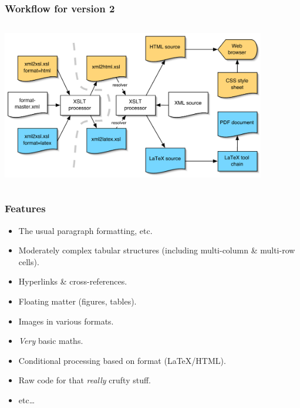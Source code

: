 \documentclass[pdftex]{beamer}
\begin{document}
\frame
{
	\frametitle{Workflow for version 2}
	
	\centering
	
	\begin{columns}
	
		\begin{column}{12cm}
	
			\centering
			\includegraphics[height=6.5cm,keepaspectratio]{v2_workflow}
		
		\end{column}
		
	\end{columns}
	
}


\frame
{
	\frametitle{Features}
	
	\begin{itemize}
	
		\item The usual paragraph formatting, etc.
		
		\item Moderately complex tabular structures (including
		multi-column \& multi-row cells).
		
		\item Hyperlinks \& cross-references.
		
		\item Floating matter (figures, tables).
		
		
		\item Images in various formats.
		
		\item \emph{Very} basic maths.
		
		\item Conditional processing based on format (\LaTeX/HTML).
	
		\item Raw code for that \emph{really} crufty stuff.
		
		\item etc\ldots
		
	\end{itemize}
}
\end{document}
